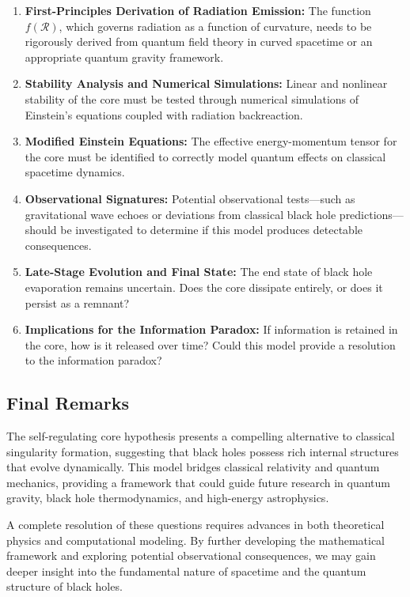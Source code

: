 \begin{enumerate}
    \item \textbf{First-Principles Derivation of Radiation Emission:} The function \( f(\mathcal{R}) \), which governs radiation as a function of curvature, needs to be rigorously derived from quantum field theory in curved spacetime or an appropriate quantum gravity framework.
    
    \item \textbf{Stability Analysis and Numerical Simulations:} Linear and nonlinear stability of the core must be tested through numerical simulations of Einstein’s equations coupled with radiation backreaction.
    
    \item \textbf{Modified Einstein Equations:} The effective energy-momentum tensor for the core must be identified to correctly model quantum effects on classical spacetime dynamics.
    
    \item \textbf{Observational Signatures:} Potential observational tests—such as gravitational wave echoes or deviations from classical black hole predictions—should be investigated to determine if this model produces detectable consequences.
    
    \item \textbf{Late-Stage Evolution and Final State:} The end state of black hole evaporation remains uncertain. Does the core dissipate entirely, or does it persist as a remnant?
    
    \item \textbf{Implications for the Information Paradox:} If information is retained in the core, how is it released over time? Could this model provide a resolution to the information paradox?
\end{enumerate}

\subsection{Final Remarks}
The self-regulating core hypothesis presents a compelling alternative to classical singularity formation, suggesting that black holes possess rich internal structures that evolve dynamically. This model bridges classical relativity and quantum mechanics, providing a framework that could guide future research in quantum gravity, black hole thermodynamics, and high-energy astrophysics.

A complete resolution of these questions requires advances in both theoretical physics and computational modeling. By further developing the mathematical framework and exploring potential observational consequences, we may gain deeper insight into the fundamental nature of spacetime and the quantum structure of black holes.

